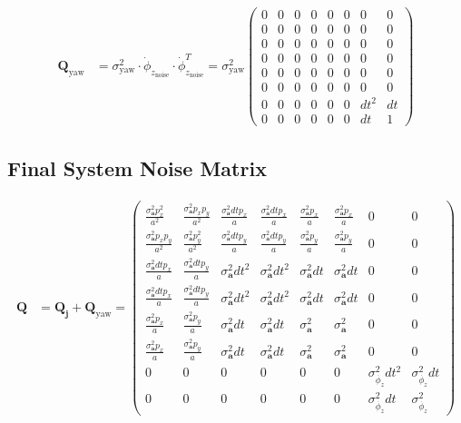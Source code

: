 \documentclass{article}
\begin{document}
\begin{align}
  \textbf{Q}_{\textrm{yaw}} &= \sigma^2_{\textrm{yaw}} \cdot \dot{\phi}_{z_\textrm{noise}} \cdot \dot{\phi}_{z_\textrm{noise}}^T
  = \sigma^2_{\textrm{yaw}} \left(\begin{matrix}0 & 0 & 0 & 0 & 0 & 0 & 0 & 0\\0 & 0 & 0 & 0 & 0 & 0 & 0 & 0\\0 & 0 & 0 & 0 & 0 & 0 & 0 & 0\\0 & 0 & 0 & 0 & 0 & 0 & 0 & 0\\0 & 0 & 0 & 0 & 0 & 0 & 0 & 0\\0 & 0 & 0 & 0 & 0 & 0 & 0 & 0\\0 & 0 & 0 & 0 & 0 & 0 & dt^{2} & dt\\0 & 0 & 0 & 0 & 0 & 0 & dt & 1\end{matrix}\right)
\end{align}

\subsection{Final System Noise Matrix}

\begin{align}
  \textbf{Q} &= \textbf{Q}_{\textbf{j}} + \textbf{Q}_{\textrm{yaw}}
  = \left(\begin{matrix}\frac{\sigma^2_\textbf{a} p_{x}^{2}}{a^{2}} & \frac{\sigma^2_\textbf{a} p_{x} p_{y}}{a^{2}} & \frac{\sigma^2_\textbf{a} dt p_{x}}{a} & \frac{\sigma^2_\textbf{a} dt p_{x}}{a} & \frac{\sigma^2_\textbf{a} p_{x}}{a} & \frac{\sigma^2_\textbf{a} p_{x}}{a} & 0 & 0\\\frac{\sigma^2_\textbf{a} p_{x} p_{y}}{a^{2}} & \frac{\sigma^2_\textbf{a} p_{y}^{2}}{a^{2}} & \frac{\sigma^2_\textbf{a} dt p_{y}}{a} & \frac{\sigma^2_\textbf{a} dt p_{y}}{a} & \frac{\sigma^2_\textbf{a} p_{y}}{a} & \frac{\sigma^2_\textbf{a} p_{y}}{a} & 0 & 0\\\frac{\sigma^2_\textbf{a} dt p_{x}}{a} & \frac{\sigma^2_\textbf{a} dt p_{y}}{a} & \sigma^2_\textbf{a} dt^{2} & \sigma^2_\textbf{a} dt^{2} & \sigma^2_\textbf{a} dt & \sigma^2_\textbf{a} dt & 0 & 0\\\frac{\sigma^2_\textbf{a} dt p_{x}}{a} & \frac{\sigma^2_\textbf{a} dt p_{y}}{a} & \sigma^2_\textbf{a} dt^{2} & \sigma^2_\textbf{a} dt^{2} & \sigma^2_\textbf{a} dt & \sigma^2_\textbf{a} dt & 0 & 0\\\frac{\sigma^2_\textbf{a} p_{x}}{a} & \frac{\sigma^2_\textbf{a} p_{y}}{a} & \sigma^2_\textbf{a} dt & \sigma^2_\textbf{a} dt & \sigma^2_\textbf{a} & \sigma^2_\textbf{a} & 0 & 0\\\frac{\sigma^2_\textbf{a} p_{x}}{a} & \frac{\sigma^2_\textbf{a} p_{y}}{a} & \sigma^2_\textbf{a} dt & \sigma^2_\textbf{a} dt & \sigma^2_\textbf{a} & \sigma^2_\textbf{a} & 0 & 0\\0 & 0 & 0 & 0 & 0 & 0 & \sigma_{\dot{\phi_z}}^2 dt^{2} & \sigma_{\dot{\phi_z}}^2 dt\\0 & 0 & 0 & 0 & 0 & 0 & \sigma_{\dot{\phi_z}}^2 dt & \sigma_{\dot{\phi_z}}^2\end{matrix}\right)
\end{align}
\end{document}
